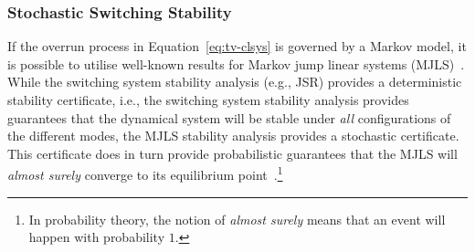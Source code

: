 \subsubsection*{Stochastic Switching Stability}%
%
If the overrun process in Equation~\eqref{eq:tv-clsys} is governed by a Markov model, it is possible to utilise well-known results for Markov jump linear systems (MJLS)~\cite{Lincoln:2002, Feng:1992, Nilsson:1998}.
While the switching system stability analysis (e.g., JSR) provides a deterministic stability certificate, i.e., the switching system stability analysis provides guarantees that the dynamical system will be stable under \emph{all} configurations of the different modes, the MJLS stability analysis provides a stochastic certificate.
This certificate does in turn provide probabilistic guarantees that the MJLS will \emph{almost surely} converge to its equilibrium point~\cite{Feng:1992}.\footnote{In probability theory, the notion of \emph{almost surely} means that an event will happen with probability $1$.}


